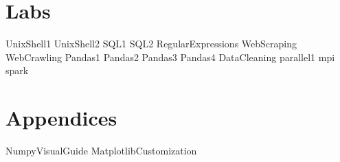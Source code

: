 \documentclass[opener-c,labs,grey,nociteref]{HJnewsiambook}
\begin{document}
\part{Labs}
{UnixShell1}
{UnixShell2}
{SQL1}
{SQL2}
{RegularExpressions}
{WebScraping}
{WebCrawling}
{Pandas1}
{Pandas2}
{Pandas3}
{Pandas4}
{DataCleaning}
{parallel1}
{mpi}
{spark}


\part{Appendices} %
\begin{appendices}
{NumpyVisualGuide}
{MatplotlibCustomization}
\end{appendices}



\end{document}
